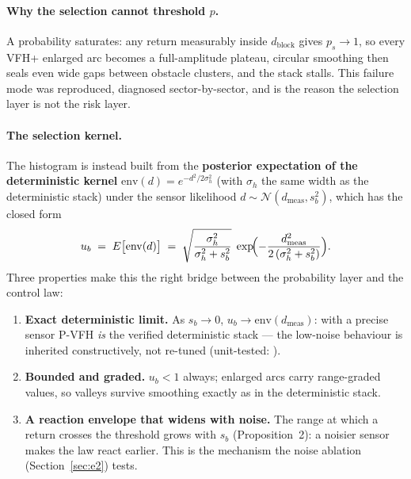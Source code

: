\paragraph{Why the selection cannot threshold $p$.} A probability saturates:
any return measurably inside $d_{\mathrm{block}}$ gives $p_s \to 1$, so every
VFH+ enlarged arc becomes a full-amplitude plateau, circular smoothing then
seals even wide gaps between obstacle clusters, and the stack stalls. This
failure mode was reproduced, diagnosed sector-by-sector, and is the reason
the selection layer is not the risk layer.

\paragraph{The selection kernel.} The histogram is instead built from the
\textbf{posterior expectation of the deterministic kernel}
$\mathrm{env}(d) = e^{-d^2/2\sigma_h^2}$ (with $\sigma_h$ the same
 width as the deterministic stack) under the sensor
likelihood $d \sim \mathcal{N}(d_{\mathrm{meas}}, s_b^2)$, which has the
closed form
\begin{equation}
u_b \;=\; E\bigl[\mathrm{env}(d)\bigr]
\;=\; \sqrt{\frac{\sigma_h^2}{\sigma_h^2 + s_b^2}}\;
\exp\!\Bigl( -\frac{d_{\mathrm{meas}}^2}{2\,(\sigma_h^2 + s_b^2)} \Bigr).
\label{eq:ukernel}
\end{equation}
Three properties make this the right bridge between the probability layer and
the control law:
\begin{enumerate}[leftmargin=1.9em]
\item \textbf{Exact deterministic limit.} As $s_b \to 0$,
$u_b \to \mathrm{env}(d_{\mathrm{meas}})$: with a precise sensor P-VFH
\emph{is} the verified deterministic stack --- the low-noise behaviour is
inherited constructively, not re-tuned (unit-tested:
).
\item \textbf{Bounded and graded.} $u_b < 1$ always; enlarged arcs carry
range-graded values, so valleys survive smoothing exactly as in the
deterministic stack.
\item \textbf{A reaction envelope that widens with noise.} The range at
which a return crosses the threshold grows with $s_b$
(Proposition~2): a noisier sensor makes the law react
earlier. This is the mechanism the noise ablation (Section~\ref{sec:e2})
tests.
\end{enumerate}

